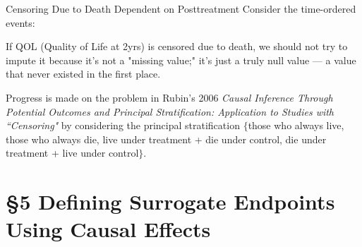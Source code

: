 \documentclass[10pt]{beamer}
\begin{document}
\begin{frame}{Censoring Due to Death Dependent on Posttreatment}
Consider the time-ordered events: 


If QOL (Quality of Life at 2yrs) is censored due to death, we should not 
try to impute it because it's not a "missing value;" it's just a truly 
null value — a value that never existed in the first place. 

{\footnotesize Progress is made on the problem in Rubin's 2006 \textit{Causal Inference Through Potential
Outcomes and Principal Stratification: Application to Studies with ``Censoring"} 
by considering the principal stratification $\{$those who always live, 
those who always die, live under treatment + die under control, die under 
treatment + live under control$\}$. }

\end{frame}

\section{\S 5 Defining Surrogate Endpoints Using Causal Effects}
\end{document}
